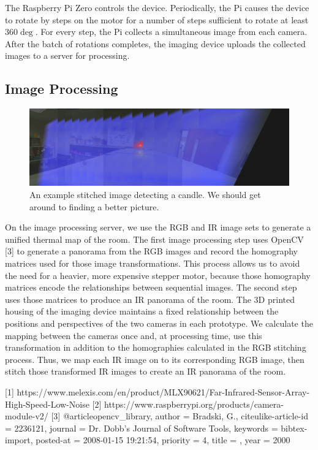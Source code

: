 The Raspberry Pi Zero controls the device. Periodically, the Pi causes the device
to rotate by steps on the motor for a number of steps sufficient to rotate at
least $360\deg$. For every step, the Pi collects a simultaneous image from each
camera. After the batch of rotations completes, the imaging device uploads the 
collected images to a server for processing.

\subsection{Image Processing}

\begin{figure}
	\centering
	\includegraphics[height=.45\textheight,width=.75\textwidth,keepaspectratio]{../img/overlay.png}
	\caption[Stitched image]{An example stitched image detecting a candle. We 
		should get around to finding a better picture.}
	\label{tis:imp:ex}
\end{figure}

On the image processing server, we use the RGB and IR image sets to generate a 
unified thermal map of the room. The first image processing step uses OpenCV [3]
to generate a panorama from the RGB images and record the homography matrices
used for those image transformations. This process allows us to avoid the need
for a heavier, more expensive stepper motor, because those homography matrices
encode the relationships between sequential images. The second step uses those 
matrices to produce an IR panorama of the room. The 3D printed housing of the
imaging device maintains a fixed relationship between the positions and
perspectives of the two cameras in each prototype. We calculate the mapping
between the cameras once and, at processing time, use this transformation in
addition to the homographies calculated in the RGB stitching process. Thus, we
map each IR image on to its corresponding RGB image, then stitch those
transformed IR images to create an IR panorama of the room.


[1] https://www.melexis.com/en/product/MLX90621/Far-Infrared-Sensor-Array-High-Speed-Low-Noise
[2] https://www.raspberrypi.org/products/camera-module-v2/
[3] @article{opencv_library,
	author = {Bradski, G.},
	citeulike-article-id = {2236121},
	journal = {Dr. Dobb's Journal of Software Tools},
	keywords = {bibtex-import},
	posted-at = {2008-01-15 19:21:54},
	priority = {4},
	title = ,
	year = {2000}
}